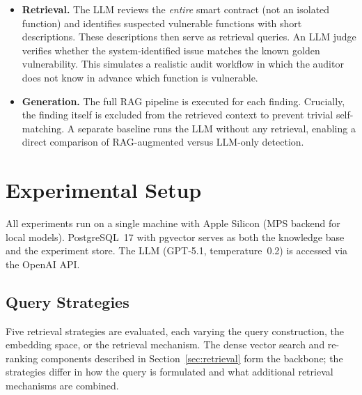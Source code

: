 \begin{itemize}
    \item \textbf{Retrieval.} The LLM reviews the \emph{entire} smart contract (not an isolated function) and identifies suspected vulnerable functions with short descriptions. These descriptions then serve as retrieval queries. An LLM judge verifies whether the system-identified issue matches the known golden vulnerability. This simulates a realistic audit workflow in which the auditor does not know in advance which function is vulnerable.

    \item \textbf{Generation.} The full RAG pipeline is executed for each finding. Crucially, the finding itself is excluded from the retrieved context to prevent trivial self-matching. A separate baseline runs the LLM without any retrieval, enabling a direct comparison of RAG-augmented versus LLM-only detection.
\end{itemize}

\section{Experimental Setup}
\label{sec:experimental-setup}

All experiments run on a single machine with Apple Silicon (MPS backend for local models). PostgreSQL~17 with pgvector serves as both the knowledge base and the experiment store. The LLM (GPT-5.1, temperature~0.2) is accessed via the OpenAI API.

\subsection{Query Strategies}
\label{subsec:query-strategies}

Five retrieval strategies are evaluated, each varying the query construction, the embedding space, or the retrieval mechanism. The dense vector search and re-ranking components described in Section~\ref{sec:retrieval} form the backbone; the strategies differ in how the query is formulated and what additional retrieval mechanisms are combined.

